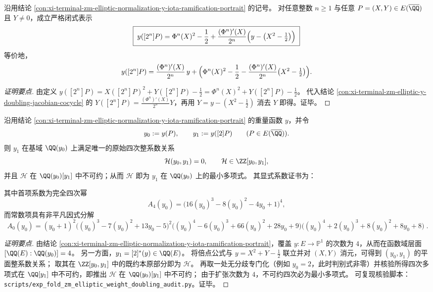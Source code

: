 \begin{conclusion}\label{con:xi-terminal-zm-elliptic-y-doubling-iterate-affine-closed}
沿用结论 \ref{con:xi-terminal-zm-elliptic-normalization-y-iota-ramification-portrait} 的记号。
对任意整数 \(n\ge 1\) 与任意 \(P=(X,Y)\in E(\overline{\QQ})\) 且 \(Y\neq 0\)，成立严格闭式表示
\[
\boxed{\;
y([2^{n}]P)
=\Phi^{n}(X)^{2}-\frac12+\frac{(\Phi^{n})'(X)}{2^{n}}\Bigl(y-\bigl(X^{2}-\tfrac12\bigr)\Bigr)\;}
\]
等价地，
\[
y([2^{n}]P)
=\frac{(\Phi^{n})'(X)}{2^{n}}\,y
+\Bigl(\Phi^{n}(X)^{2}-\frac12-\frac{(\Phi^{n})'(X)}{2^{n}}\bigl(X^{2}-\tfrac12\bigr)\Bigr).
\]
\end{conclusion}
\begin{proof}[证明要点]
由定义 \(y([2^{n}]P)=X([2^{n}]P)^{2}+Y([2^{n}]P)-\tfrac12=\Phi^{n}(X)^{2}+Y([2^{n}]P)-\tfrac12\)。
代入结论 \ref{con:xi-terminal-zm-elliptic-y-doubling-jacobian-cocycle} 的
\(
Y([2^{n}]P)=\frac{(\Phi^{n})'(X)}{2^{n}}Y
\)，再用 \(Y=y-(X^{2}-\tfrac12)\) 消去 \(Y\) 即得。证毕。
\end{proof}

\begin{conclusion}\label{con:xi-terminal-zm-elliptic-weight-doubling-quartic-minpoly}
沿用结论 \ref{con:xi-terminal-zm-elliptic-normalization-y-iota-ramification-portrait} 的重量函数 \(y\)，并令
\[
y_0:=y(P),\qquad y_1:=y([2]P)\qquad(P\in E(\overline{\QQ})).
\]
则 \(y_1\) 在基域 \(\QQ(y_0)\) 上满足唯一的原始四次整系数关系
\[
\mathcal H(y_0,y_1)=0,
\qquad
\mathcal H\in\ZZ[y_0,y_1],
\]
并且 \(\mathcal H\) 在 \(\QQ(y_0)[y_1]\) 中不可约；从而 \(\mathcal H\) 即为 \(y_1\) 在 \(\QQ(y_0)\) 上的最小多项式。
其显式系数证书为：

其中首项系数为完全四次幂
\[
A_{4}(y_0)=\bigl(16(y_0)^{3}-8(y_0)^{2}-4y_0+1\bigr)^{4},
\]
而常数项具有非平凡因式分解
\[
\boxed{\;
A_{0}(y_0)
=(y_0+1)^{2}\bigl((y_0)^{3}-7(y_0)^{2}+13y_0-5\bigr)^{2}
\bigl((y_0)^{4}-6(y_0)^{3}+66(y_0)^{2}+28y_0+9\bigr)
\bigl((y_0)^{4}+2(y_0)^{3}+8(y_0)^{2}+8y_0+8\bigr)\; }.
\]
\end{conclusion}
\begin{proof}[证明要点]
由结论 \ref{con:xi-terminal-zm-elliptic-normalization-y-iota-ramification-portrait}，覆盖 \(y:E\to\mathbb P^{1}\) 的次数为 \(4\)，从而在函数域层面
\(
[\QQ(E):\QQ(y_0)]=4
\)。
另一方面，\(y_1=[2]^*(y)\in\QQ(E)\)。
将倍点公式与 \(y=X^{2}+Y-\tfrac12\) 联立并对 \((X,Y)\) 消元，可得到 \((y_0,y_1)\) 的平面整系数关系；
取其在 \(\ZZ[y_0,y_1]\) 中的既约本原部分即为 \(\mathcal H\)。
再取一处无分歧专门化（例如 \(y_0=2\)，此时判别式非零）并核验所得四次多项式在 \(\QQ[y_1]\) 中不可约，即推出 \(\mathcal H\) 在 \(\QQ(y_0)[y_1]\) 中不可约；
由于扩张次数为 \(4\)，不可约四次必为最小多项式。
可复现核验脚本：\texttt{scripts/exp\_fold\_zm\_elliptic\_weight\_doubling\_audit.py}。证毕。
\end{proof}

